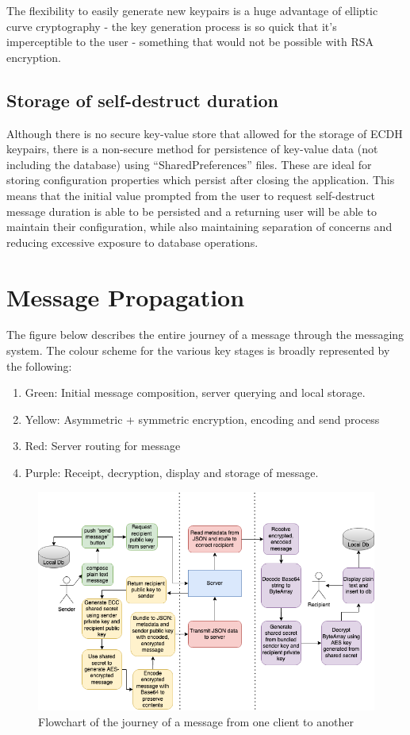 \documentclass{mproj}
\begin{document}
The flexibility to easily generate new keypairs is a huge advantage of elliptic curve cryptography - the key generation process is so quick that it's imperceptible to the user - something that would not be possible with RSA encryption.

\subsection{Storage of self-destruct duration}
Although there is no secure key-value store that allowed for the storage of ECDH keypairs, there is a non-secure method for persistence of key-value data (not including the database) using ``SharedPreferences'' files. These are ideal for storing configuration properties which persist after closing the application. This means that the initial value prompted from the user to request self-destruct message duration is able to be persisted and a returning user will be able to maintain their configuration, while also maintaining separation of concerns and reducing excessive exposure to database operations.

\section{Message Propagation}
The figure below describes the entire journey of a message through the messaging system. The colour scheme for the various key stages is broadly represented by the following:
\begin{enumerate}
	\item Green: Initial message composition, server querying and local storage.
	\item Yellow: Asymmetric + symmetric encryption, encoding and send process
	\item Red: Server routing for message
	\item Purple: Receipt, decryption, display and storage of message.
\end{enumerate}

\begin{figure}[H]
\includegraphics[scale=0.5]{images/message-flow.png}
\caption{Flowchart of the journey of a message from one client to another}
\end{figure}
\end{document}
